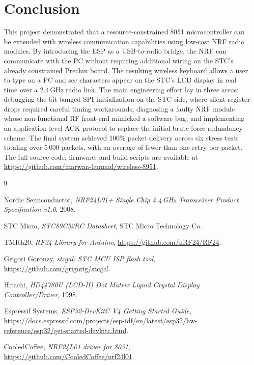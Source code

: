 \documentclass[12pt, a4paper]{article}
\begin{document}
\section{Conclusion}

This project demonstrated that a resource-constrained 8051 microcontroller can be extended with wireless communication capabilities using low-cost NRF radio modules. By introducing the ESP as a USB-to-radio bridge, the NRF can communicate with the PC without requiring additional wiring on the STC's already constrained Prechin board. The resulting wireless keyboard allows a user to type on a PC and see characters appear on the STC's LCD display in real time over a 2.4\,GHz radio link. The main engineering effort lay in three areas: debugging the bit-banged SPI initialization on the STC side, where silent register drops required careful timing workarounds; diagnosing a faulty NRF module whose non-functional RF front-end mimicked a software bug; and implementing an application-level ACK protocol to replace the initial brute-force redundancy scheme. The final system achieved 100\% packet delivery across six stress tests totaling over 5\,000 packets, with an average of fewer than one retry per packet. The full source code, firmware, and build scripts are available at \url{https://github.com/marwan-humaid/wireless-8951}.

\begin{thebibliography}{9}

 Nordic Semiconductor, \textit{NRF24L01+ Single Chip 2.4\,GHz Transceiver Product Specification v1.0}, 2008.

 STC Micro, \textit{STC89C52RC Datasheet}, STC Micro Technology Co.

 TMRh20, \textit{RF24 Library for Arduino}, \url{https://github.com/nRF24/RF24}.

 Grigori Goronzy, \textit{stcgal: STC MCU ISP flash tool}, \url{https://github.com/grigorig/stcgal}.

 Hitachi, \textit{HD44780U (LCD-II) Dot Matrix Liquid Crystal Display Controller/Driver}, 1998.

 Espressif Systems, \textit{ESP32-DevKitC V4 Getting Started Guide}, \url{https://docs.espressif.com/projects/esp-idf/en/latest/esp32/hw-reference/esp32/get-started-devkitc.html}.

 CooledCoffee, \textit{NRF24L01 driver for 8051}, \url{https://github.com/CooledCoffee/nrf24l01}.

\end{thebibliography}
\end{document}
